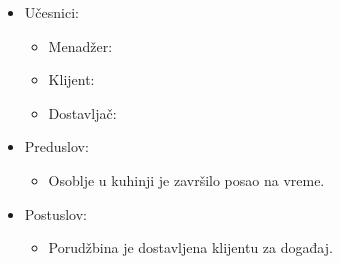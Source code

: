 \documentclass[a4paper]{article}
\begin{document}
  \begin{itemize}
        \item Učesnici:
         \begin{itemize}
        \item Menadžer:
    \end{itemize}
          \begin{itemize}
        \item Klijent:
    \end{itemize}
      \begin{itemize}
        \item Dostavljač:
    \end{itemize}
    \end{itemize}
      \begin{itemize}
        \item Preduslov:
          \begin{itemize}
        \item Osoblje u kuhinji je završilo posao na vreme.
       
   \end{itemize}
    
    \end{itemize}
      \begin{itemize}
        \item Postuslov:
          \begin{itemize}
        \item Porudžbina je dostavljena klijentu za događaj.
    \end{itemize}
    \end{itemize}
\end{document}
